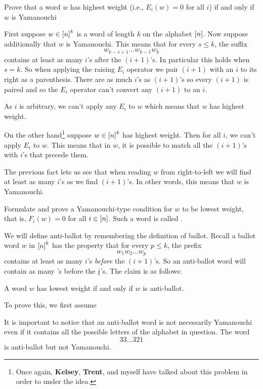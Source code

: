 \documentclass[12pt]{memoir}
\begin{document}
\begin{Ej}[Exercise 3]
    Prove that a word $w$ has highest weight (i.e., $E_i(w)=0$ for all $i$) if and only if $w$ is Yamanouchi
\end{Ej}
\begin{ptcbr}
    First suppose $w\in\left\lbrack n\right\rbrack^k$ is a word of length $k$ on the alphabet $\left\lbrack n\right\rbrack$. Now suppose additionally that $w$ is Yamanouchi. This means that for every $s\leq k$, the suffix 
    $$w_{k-s+1}\dots w_{k-1}w_k$$ 
    contains at least as many $i$'s after the $(i+1)$'s. In particular this holds when $s=k$. So when applying the raising $E_i$ operator we pair $(i+1)$ with an $i$ to its right as a parenthesis. There are as much $i$'s as $(i+1)$'s so every $(i+1)$ is paired and so the $E_i$ operator can't convert any $(i+1)$ to an $i$.\par 
    As $i$ is arbitrary, we can't apply any $E_i$ to $w$ which means that $w$ has highest weight.\par 
    On the other hand\footnote{Once again, \textbf{Kelsey}, \textbf{Trent}, and myself have talked about this problem in order to under the idea.} suppose $w\in\left\lbrack n\right\rbrack^k$ has highest weight. Then for all $i$, we can't apply $E_i$ to $w$. This means that in $w$, it is possible to match all the $(i+1)$'s with $i$'s that precede them.\par 
    The previous fact lets us see that when reading $w$ from right-to-left we will find at least as many $i$'s as we find $(i+1)$'s. In other words, this means that $w$ is Yamanouchi.
    \end{ptcbr}


\begin{Ej}[Exercise 4]
    Formulate and prove a Yamanouchi-type condition for $w$ to be lowest weight, that is, $F_i(w) = 0$
for all $i\in\left\lbrack n\right\rbrack$. Such a word is called .
\end{Ej}

\begin{ptcbr}
We will define anti-ballot by remembering the definition of ballot. Recall a ballot word $w$ in $\left\lbrack n\right\rbrack^k$ has the property that for every $p\leq k$, the prefix 
$$w_1w_2\dots w_p$$
contains at least as many $i$'s \emph{before} the $(i+1)$'s. So an anti-ballot word will contain as many 's before the $\underline i$'s. The claim is as follows:
\begin{significant}
A word $w$ has lowest weight if and only if $w$ is anti-ballot.
\end{significant}
To prove this, we first assume 
\end{ptcbr}

\begin{Rmk}
It is important to notice that an anti-ballot word is not necessarily Yamanouchi even if it contains all the possible letters of the alphabet in question. The word 
$$33\dots 321$$
is anti-ballot but not Yamanouchi. 
\end{Rmk}
\end{document}
